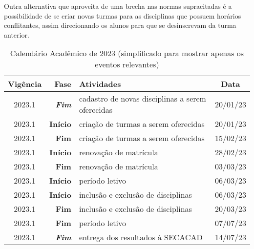 Outra alternativa que aproveita de uma brecha nas normas supracitadas é a possibilidade de se criar novas turmas para as disciplinas que possuem horários conflitantes, assim direcionando os alunos para que se desinscrevam da turma anterior.
\begin{table}[H] \centering \caption{Calendário Acadêmico de 2023 (simplificado para mostrar apenas os eventos relevantes)} \label{tab:calendario_2023-Enxuto}
  \begin{tabular}{| c r l c |}
    \hline
    \textbf{Vigência} & \textbf{Fase}         & \textbf{Atividades}                              & \textbf{Data} \\
    \hline

    2023.1            & \textbf{\textit{Fim}} & cadastro de novas disciplinas a serem oferecidas & 20/01/23      \\
    2023.1            & \textbf{Início}       & criação de turmas a serem oferecidas             & 20/01/23      \\
    2023.1            & \textbf{Fim}          & criação de turmas a serem oferecidas             & 15/02/23      \\
    2023.1            & \textbf{Início}       & renovação de matrícula                           & 28/02/23      \\
    2023.1            & \textbf{Fim}          & renovação de matrícula                           & 03/03/23      \\
    2023.1            & \textbf{Início}       & período letivo                                   & 06/03/23      \\
    2023.1            & \textbf{Início}       & inclusão e exclusão de disciplinas               & 06/03/23      \\
    2023.1            & \textbf{Fim}          & inclusão e exclusão de disciplinas               & 20/03/23      \\
    2023.1            & \textbf{Fim}          & período letivo                                   & 07/07/23      \\
    2023.1            & \textbf{\textit{Fim}} & entrega dos resultados à SECACAD                 & 14/07/23      \\


\end{tabular}
\end{table}

